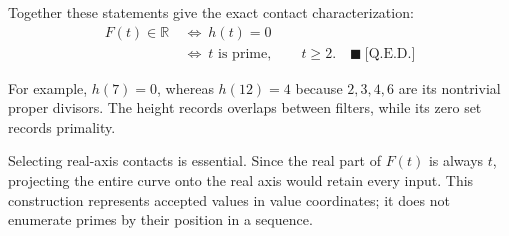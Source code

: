 Together these statements give the exact contact characterization:
\begin{equation*}
\begin{aligned}
F(t)\in\mathbb R
&\ \Longleftrightarrow\ h(t)=0\\
&\ \Longleftrightarrow\ t\text{ is prime},\qquad t\ge2.
\quad\blacksquare\ \text{[Q.E.D.]}
\end{aligned}
\end{equation*}

For example, $h(7)=0$, whereas $h(12)=4$ because $2,3,4,6$ are its
nontrivial proper divisors. The height records overlaps between filters,
while its zero set records primality.

Selecting real-axis contacts is essential. Since the real part of $F(t)$ is
always $t$, projecting the entire curve onto the real axis would retain every
input. This construction represents accepted values in value coordinates;
it does not enumerate primes by their position in a sequence.
